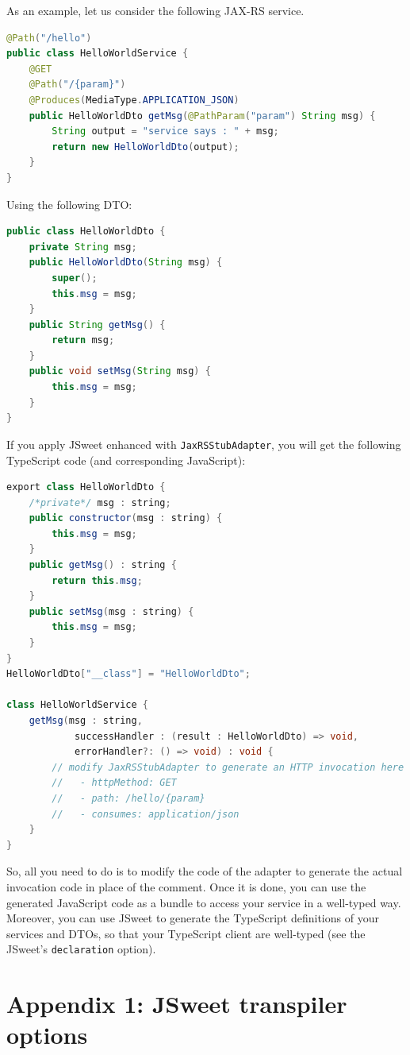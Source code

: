 \documentclass[a4paper]{report}
\begin{document}
As an example, let us consider the following JAX-RS service.

\begin{lstlisting}[language=Java]
@Path("/hello")
public class HelloWorldService {
	@GET
	@Path("/{param}")
	@Produces(MediaType.APPLICATION_JSON)
	public HelloWorldDto getMsg(@PathParam("param") String msg) {
		String output = "service says : " + msg;
		return new HelloWorldDto(output);
	}
}
\end{lstlisting}

\noindent
Using the following DTO:

\begin{lstlisting}[language=Java]
public class HelloWorldDto {
	private String msg;
	public HelloWorldDto(String msg) {
		super();
		this.msg = msg;
	}
	public String getMsg() {
		return msg;
	}
	public void setMsg(String msg) {
		this.msg = msg;
	}
}
\end{lstlisting}

\noindent
If you apply JSweet enhanced with \texttt{JaxRSStubAdapter}, you will get the following TypeScript code (and corresponding JavaScript):

\begin{lstlisting}[language=Java]
export class HelloWorldDto {
	/*private*/ msg : string;
	public constructor(msg : string) {
		this.msg = msg;
	}
	public getMsg() : string {
		return this.msg;
	}
	public setMsg(msg : string) {
		this.msg = msg;
	}
}
HelloWorldDto["__class"] = "HelloWorldDto";

class HelloWorldService {
	getMsg(msg : string, 
			successHandler : (result : HelloWorldDto) => void, 
			errorHandler?: () => void) : void {
		// modify JaxRSStubAdapter to generate an HTTP invocation here
		//   - httpMethod: GET
		//   - path: /hello/{param}
		//   - consumes: application/json
	}
}
\end{lstlisting}

\noindent
So, all you need to do is to modify the code of the adapter to generate the actual invocation code in place of the comment. Once it is done, you can use the generated JavaScript code as a bundle to access your service in a well-typed way. Moreover, you can use JSweet to generate the TypeScript definitions of your services and DTOs, so that your TypeScript client are well-typed (see the JSweet's \texttt{declaration} option).

\chapter*{Appendix 1: JSweet transpiler options}
\end{document}
